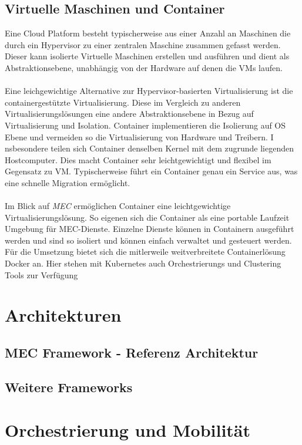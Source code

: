 \documentclass[runningheads]{llncs}
\numberwithin{figure}{section}
\begin{document}
\subsection{Virtuelle Maschinen und Container}
\label{subsec:Virtuelle Maschinen und Container}
Eine Cloud Platform besteht typischerweise aus einer Anzahl an Maschinen die durch ein Hypervisor zu einer zentralen Maschine zusammen gefasst werden.
Dieser kann isolierte Virtuelle Maschinen erstellen und ausführen und dient als Abstraktionsebene, unabhängig von der Hardware auf denen die VMs laufen.
\\
\\
Eine leichgewichtige Alternative zur Hypervisor-basierten Virtualisierung ist die containergestützte Virtualisierung. 
Diese im Vergleich zu anderen Virtualisierungslösungen eine andere  Abstraktionsebene in Bezug auf Virtualisierung und Isolation. 
Container implementieren die Isolierung auf OS Ebene und vermeiden so die Virtualisierung von Hardware und Treibern. I
nsbesondere teilen sich Container denselben Kernel mit dem zugrunde liegenden Hostcomputer. Dies macht Container sehr leichtgewichtigt und flexibel im 
Gegensatz zu VM. Typischerweise führt ein Container genau ein Service aus, was eine schnelle Migration ermöglicht.
\\
\\
Im Blick auf \textit{MEC} ermöglichen Container eine leichtgewichtige Virtualisierungslösung. So eigenen sich die Container
als eine portable Laufzeit Umgebung für MEC-Dienste. Einzelne Dienste können in Containern ausgeführt werden und sind so isoliert und können einfach 
verwaltet und gesteuert werden. Für die Umsetzung bietet sich die mitlerweile weitverbreitete Containerlösung Docker an. Hier stehen mit 
Kubernetes auch Orchestrierungs und Clustering Tools zur Verfügung  \cite{morabitoConsolidateIoTEdge2018}
\newpage
\section{Architekturen}
\label{sec:Architekturen}
\subsection{MEC Framework - Referenz Architektur}
\label{subsec:MEC Framework}
\subsection{Weitere Frameworks}
\label{subsec:Weitere Frameworks}
\section{Orchestrierung und Mobilität}
\label{sec:Orchestrierung und Mobilität}
\end{document}
